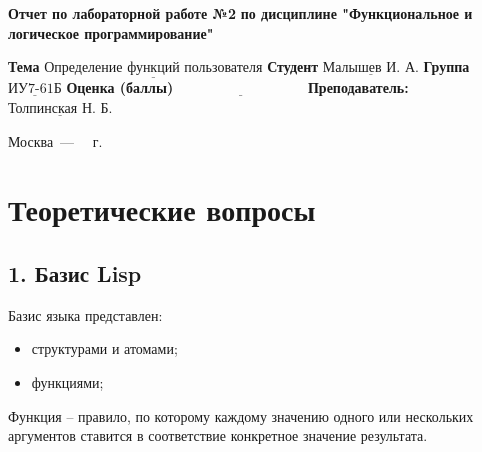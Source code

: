 \documentclass[12pt]{report}
\begin{document}
\begin{titlepage}
	
	\begin{center}
		\noindent\begin{minipage}{1.3\textwidth}\centering
			\Large\textbf{  Отчет по лабораторной работе №2}\newline
			\textbf{по дисциплине \newline "Функциональное и логическое программирование"}\newline\newline
		\end{minipage}
	\end{center}
	
	\noindent\textbf{Тема} $\underline{\text{Определение функций пользователя}}$\newline\newline
	\noindent\textbf{Студент} $\underline{\text{Малышев И. А.}}$\newline\newline
	\noindent\textbf{Группа} $\underline{\text{ИУ7-61Б}}$\newline\newline
	\noindent\textbf{Оценка (баллы)} $\underline{\text{~~~~~~~~~~~~~~~~~~~~~~~~~~~}}$\newline\newline
	\noindent\textbf{Преподаватель: } $\underline{\text{Толпинская Н. Б.}}$\newline\newline\newline
	
	\begin{center}
		\vfill
		Москва~---~\the\year
		~г.
	\end{center}
\end{titlepage}


\setcounter{page}{2}
\chapter*{Теоретические вопросы}

\section*{1. Базис Lisp}

Базис языка представлен:
\begin{itemize}
	\item структурами и атомами;
	\item функциями;
\end{itemize}

Функция -- правило, по которому каждому значению одного или нескольких аргументов ставится в соответствие конкретное значение результата.
\end{document}
